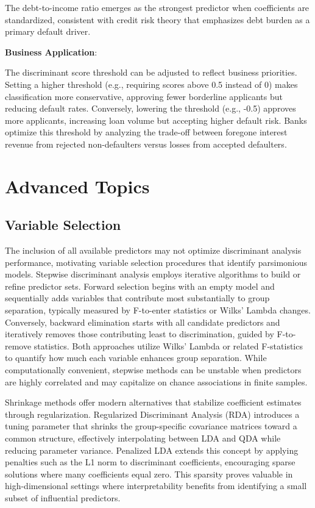 \documentclass[
]{article}
\begin{document}
The debt-to-income ratio emerges as the strongest predictor when
coefficients are standardized, consistent with credit risk theory that
emphasizes debt burden as a primary default driver.

\textbf{Business Application}:

The discriminant score threshold can be adjusted to reflect business
priorities. Setting a higher threshold (e.g., requiring scores above 0.5
instead of 0) makes classification more conservative, approving fewer
borderline applicants but reducing default rates. Conversely, lowering
the threshold (e.g., -0.5) approves more applicants, increasing loan
volume but accepting higher default risk. Banks optimize this threshold
by analyzing the trade-off between foregone interest revenue from
rejected non-defaulters versus losses from accepted defaulters.

\section{Advanced Topics}

\subsection{Variable Selection}

The inclusion of all available predictors may not optimize discriminant
analysis performance, motivating variable selection procedures that
identify parsimonious models. Stepwise discriminant analysis employs
iterative algorithms to build or refine predictor sets. Forward
selection begins with an empty model and sequentially adds variables
that contribute most substantially to group separation, typically
measured by F-to-enter statistics or Wilks' Lambda changes. Conversely,
backward elimination starts with all candidate predictors and
iteratively removes those contributing least to discrimination, guided
by F-to-remove statistics. Both approaches utilize Wilks' Lambda or
related F-statistics to quantify how much each variable enhances group
separation. While computationally convenient, stepwise methods can be
unstable when predictors are highly correlated and may capitalize on
chance associations in finite samples.

Shrinkage methods offer modern alternatives that stabilize coefficient
estimates through regularization. Regularized Discriminant Analysis
(RDA) introduces a tuning parameter that shrinks the group-specific
covariance matrices toward a common structure, effectively interpolating
between LDA and QDA while reducing parameter variance. Penalized LDA
extends this concept by applying penalties such as the L1 norm to
discriminant coefficients, encouraging sparse solutions where many
coefficients equal zero. This sparsity proves valuable in
high-dimensional settings where interpretability benefits from
identifying a small subset of influential predictors.
\end{document}
